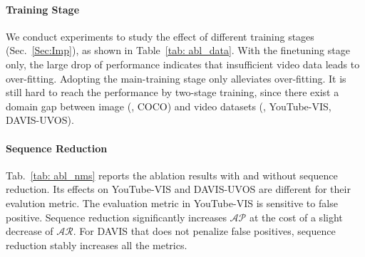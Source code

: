 \documentclass[10pt,twocolumn,letterpaper]{article}
\begin{document}
	
	\begin{table}[t]
		\centering
		\vspace{0.05in}
		\caption{Training data analysis on YouTube-VIS and DAVIS-UVOS validation set. `Both' denotes two-stage training, including main-training and finetuning. We report $\mathcal{AP}$ for YouTube-VIS and $\mathcal{J\&F}$ for DAVIS-UVOS.
		}\label{tab: abl_data}
		\vspace{-0.1in}
	\end{table}
	
	\vspace{-0.15in}
	\paragraph{Training Stage}\label{Sec: trainstage}
	We conduct experiments to study the effect of different training stages (Sec.~\ref{Sec:Imp}), as shown in Table~\ref{tab: abl_data}. With the finetuning stage only, the large drop of performance indicates that insufficient video data leads to over-fitting.
	Adopting the main-training stage only alleviates over-fitting. It is still hard to reach the performance by two-stage training, since there exist a domain gap between image (\ie, COCO) and video datasets (\ie, YouTube-VIS, DAVIS-UVOS).
	
	\vspace{-0.15in}
	\paragraph{Sequence Reduction}
	Tab.~\ref{tab: abl_nms} reports the ablation results with and without sequence reduction. Its effects on YouTube-VIS and DAVIS-UVOS are different for their evalution metric. The evaluation metric in YouTube-VIS is sensitive to false positive. Sequence reduction significantly increases $\mathcal{AP}$ at the cost of a slight decrease of $\mathcal{AR}$. For DAVIS that does not penalize false positives, sequence reduction stably increases all the metrics.
	
\end{document}
